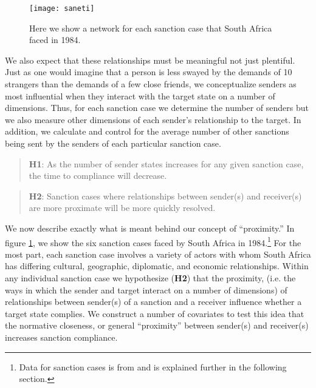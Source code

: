 \begin{figure}[ht]
	\centering
	\texttt{[image: saneti]}
	\caption{Here we show a network for each sanction case that South Africa faced in 1984.}
	\label{fig:saneti}
\end{figure}
\FloatBarrier


We also expect that these relationships must be meaningful not just plentiful. Just as one would imagine that a person is less swayed by the demands of 10 strangers than the demands of a few close friends, we conceptualize senders as most influential when they interact with the target state on a number of dimensions.  Thus, for each sanction case we determine the number of senders but we also measure other dimensions of each sender's relationship to the target. In addition, we calculate and control for the average number of other sanctions being sent by the senders of each particular sanction case.

\begin{quote}
	\textbf{H1}: As the number of sender states increases for any given sanction case, the time to compliance will decrease. 
\end{quote}

\begin{quote}
	\textbf{H2}: Sanction cases where relationships between sender(s) and receiver(s) are more proximate will be more quickly resolved.
\end{quote}

 We now describe exactly what is meant behind our concept of ``proximity.'' In figure \ref{fig:saneti}, we show the six sanction cases faced by South Africa in 1984.\footnote{Data for sanction cases is from \citet{morgan2009threat} and is explained further in the following section.} For the most part, each sanction case involves a variety of actors with whom South Africa has differing cultural, geographic, diplomatic, and economic relationships. Within any individual sanction case we hypothesize (\textbf{H2}) that the proximity, (i.e. the ways in which the sender and target interact on a number of dimensions) of relationships between sender(s) of a sanction and a receiver influence whether a target state complies. We construct a number of covariates to test this idea that the normative closeness, or general ``proximity'' between sender(s) and receiver(s) increases sanction compliance. 

